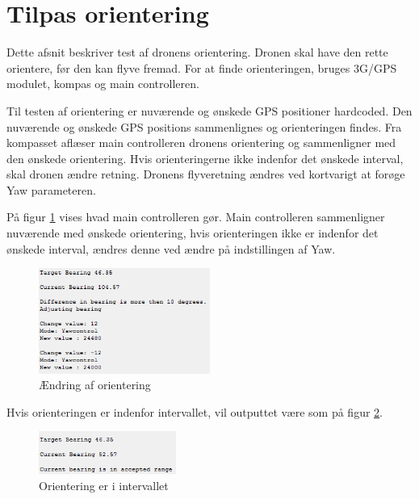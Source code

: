 \newpage

\section{Tilpas orientering}

Dette afsnit beskriver test af dronens orientering. Dronen skal have den rette orientere, før den kan flyve fremad. For at finde orienteringen, bruges 3G/GPS modulet, kompas og main controlleren.

Til testen af orientering er nuværende og ønskede GPS positioner hardcoded. 
Den nuværende og ønskede GPS positions sammenlignes og orienteringen findes. 
Fra kompasset aflæser main controlleren dronens orientering og sammenligner med den ønskede orientering. Hvis orienteringerne ikke indenfor det ønskede interval, skal dronen ændre retning. Dronens flyveretning ændres ved kortvarigt at forøge Yaw parameteren. 


På figur \ref{fig:orientering_skift} vises hvad main controlleren gør. Main controlleren sammenligner nuværende med ønskede orientering, hvis orienteringen ikke er indenfor det ønskede interval, ændres denne ved ændre på indstillingen af Yaw.

\begin{figure}[H]
\centering
\includegraphics[width=0.5\textwidth]{Billeder/Test/bearing_test.png}
\caption{Ændring af orientering}
\label{fig:orientering_skift}
\end{figure}

\vspace{0.5cm}

Hvis orienteringen er indenfor intervallet, vil outputtet være som på figur \ref{fig:orientering_interval}.

\begin{figure}[H]
\centering
\includegraphics[width=0.4\textwidth]{Billeder/Test/bearing_reached.png}
\caption{Orientering er i intervallet}
\label{fig:orientering_interval}
\end{figure}